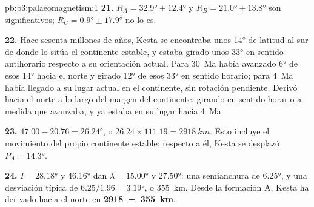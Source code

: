 \begin{solution}{pb:b3:palaeomagnetism:1}
\textbf{21.} $R_A = \ang{32.9} \pm \ang{12.4}$ y $R_B = \ang{21.0} \pm
\ang{13.8}$ son significativos; $R_C = \ang{0.9} \pm \ang{17.9}$ no lo es.

\textbf{22.} Hace sesenta millones de años, Kesta se encontraba unos \ang{14} de latitud
al sur de donde lo sitúa el continente estable, y estaba girado unos \ang{33}
en sentido antihorario respecto a su orientación actual. Para \qty{30}{Ma} había avanzado
\ang{6} de esos \ang{14} hacia el norte y girado \ang{12} de esos \ang{33} en sentido horario;
para \qty{4}{Ma} había llegado a su lugar actual en el continente,
sin rotación pendiente. Derivó hacia el norte a lo largo del margen del continente, girando
en sentido horario a medida que avanzaba, y ya estaba en su lugar hacia \qty{4}{Ma}.

\textbf{23.} $47.00 - 20.76 = \ang{26.24}$, o $26.24\times111.19 =
\qty{2918}{km}$. Esto incluye el movimiento del propio continente estable;
respecto a él, Kesta se desplazó $P_A = \ang{14.3}$.

\textbf{24.} $I = \ang{28.18}$ y \ang{46.16} dan $\lambda = \ang{15.00}$ y
\ang{27.50}: una semianchura de \ang{6.25}, y una desviación típica de
$6.25/1.96 = \ang{3.19}$, o \qty{355}{km}. Desde la formación A, Kesta ha derivado
hacia el norte en
\textbf{\qty[text-series-to-math=true]{2918 \pm 355}{km}}.
\end{solution}
